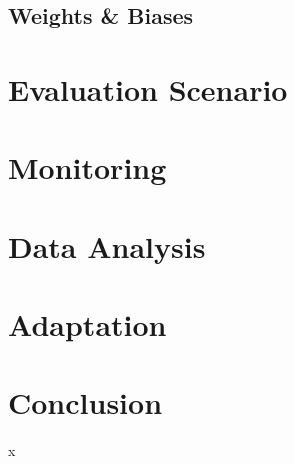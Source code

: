   \subsection{Weights \& Biases}
\section{Evaluation Scenario}
\section{Monitoring}
\section{Data Analysis}
\section{Adaptation}
\section{Conclusion}x